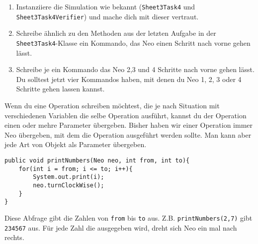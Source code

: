 
\begin{enumerate}
	\item
	Instanziiere die Simulation wie bekannt (\lstinline{Sheet3Task4} und \lstinline{Sheet3Task4Verifier}) und mache dich mit dieser vertraut.
	\item
		Schreibe ähnlich zu den Methoden aus der letzten Aufgabe in der \lstinline{Sheet3Task4}-Klasse ein Kommando, das Neo einen Schritt nach vorne gehen lässt.
	\item
		Schreibe je ein Kommando das Neo 2,3 und 4 Schritte nach vorne gehen lässt.
		Du solltest jetzt vier Kommandos haben, mit denen du Neo 1, 2, 3 oder 4 Schritte gehen lassen kannst.
\end{enumerate}

\begin{Infobox}[Operationsparameter]
	Wenn du eine Operation schreiben möchtest, die je nach Situation mit verschiedenen Variablen die selbe Operation ausführt, kannst du der Operation einen oder mehre Parameter übergeben.
	Bisher haben wir einer Operation immer Neo übergeben, mit dem die Operation ausgeführt werden sollte.
	Man kann aber jede Art von Objekt als Parameter übergeben.

	\begin{lstlisting}[xleftmargin=0.5cm]
public void printNumbers(Neo neo, int from, int to){
    for(int i = from; i <= to; i++){
		System.out.print(i);
		neo.turnClockWise();
    }
}
	\end{lstlisting}

	Diese Abfrage gibt die Zahlen von \lstinline{from} bis \lstinline{to} aus.
	Z.B. \lstinline{printNumbers(2,7)} gibt \lstinline{234567} aus.
	Für jede Zahl die ausgegeben wird, dreht sich Neo ein mal nach rechts.
\end {Infobox}


